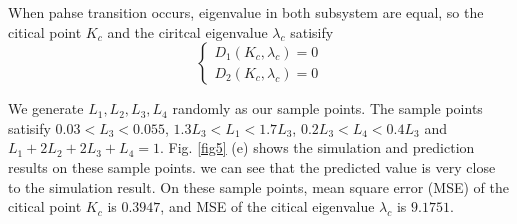 \documentclass[a4paper,11pt]{article}
\begin{document}
When pahse transition occurs, eigenvalue in both subsystem are equal, so the citical point $K_c$ and the ciritcal eigenvalue $\lambda_c$ satisify
\begin{equation}\label{phase0}
\left\{
\begin{split}
D_1(K_c, \lambda_c) = 0 \\
D_2(K_c, \lambda_c) = 0
\end{split}
\right.
\end{equation}

We generate $L_1, L_2, L_3, L_4$ randomly as our sample points. The sample points satisify $0.03 < L_3 < 0.055$, $1.3 L_3 < L_1 < 1.7 L_3$, $0.2 L_3 < L_4 < 0.4 L_3$ and $L_1 + 2 L_2 + 2 L_3 + L_4 = 1$. Fig. \ref{fig5} (e) shows the simulation and prediction results on these sample points. we can see  that the predicted value is very close to the simulation result. On these sample points, mean square error (MSE) of the citical point $K_c$ is $0.3947$, and MSE of the citical eigenvalue $\lambda_c$ is $9.1751$.
\end{document}

